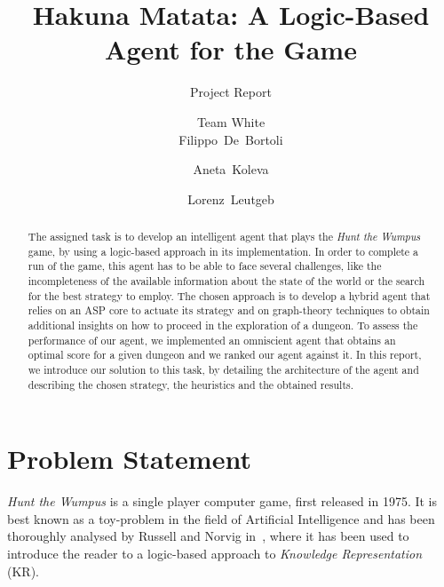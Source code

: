 \documentclass{llncs}
\title{Hakuna Matata: A Logic-Based Agent for the \htw Game}
\subtitle{Project Report}
\author{Team White\\[2mm]Filippo~De~Bortoli \and Aneta~Koleva \and Lorenz~Leutgeb}
\institute{Free University of Bozen-Bolzano\\[3mm] \texttt{\{\href{mailto:filippo.debortoli@stud-inf.unibz.it}{filippo.debortoli},\href{mailto:aneta.koleva@stud-inf.unibz.it}{aneta.koleva},\href{mailto:lorenz.leutgeb@stud-inf.unibz.it}{lorenz.leutgeb}\}\newline @stud-inf.unibz.it}}
\newcommand{\htw}{\emph{Hunt the Wumpus }}
\begin{document}
\maketitle
\thispagestyle{plain}

\begin{abstract}
  The assigned task is to develop an intelligent agent that plays the \htw game, by using a logic-based approach in its implementation.
  In order to complete a run of the game, this agent has to be able to face several challenges, like the incompleteness of the available information about the state of the world or the search for the best strategy to employ.
  The chosen approach is to develop a hybrid agent that relies on an ASP core to actuate its strategy and on graph-theory techniques to obtain additional insights on how to proceed in the exploration of a dungeon.
  To assess the performance of our agent, we implemented an omniscient agent that obtains an optimal score for a given dungeon and we ranked our agent against it.
  In this report, we introduce our solution to this task, by detailing the architecture of the agent and describing the chosen strategy, the heuristics and the obtained results.
\end{abstract}

\section{Problem Statement}

\htw is a single player computer game, first released in 1975.
It is best known as a toy-problem in the field of Artificial Intelligence and has been thoroughly analysed by Russell and Norvig in~\cite{book:aima}, where it has been used to introduce the reader to a logic-based approach to \emph{Knowledge Representation} (KR). 
\end{document}
